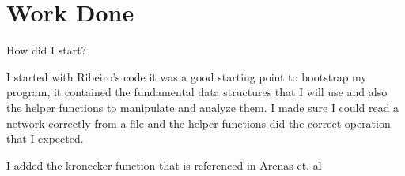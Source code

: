 \chapter{Work Done}\label{chap:work}

How did I start?

I started with Ribeiro's code it was a good starting point to bootstrap my program, it contained the fundamental data structures that I will use and also the helper functions to manipulate and analyze them. I made sure I could read a network correctly from a file and the helper functions did the correct operation that I expected.

I added the kronecker function that is referenced in Arenas et. al \cite{}